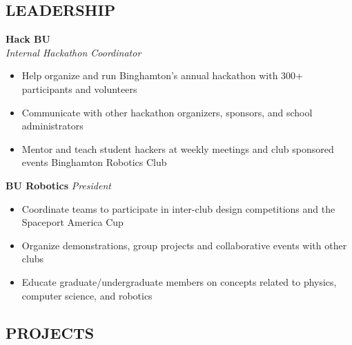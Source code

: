 \documentclass[11pt]{article}
\begin{document}
\subsection*{LEADERSHIP}
\vspace{1mm}
\spacedhrule{0.1em}{0.9em}
\textbf{Hack BU} \\
\textit{Internal Hackathon Coordinator}
\begin{itemize}
	\item Help organize and run Binghamton's annual hackathon with 300+ participants and volunteers
	\item Communicate with other hackathon organizers, sponsors, and school administrators
	\item Mentor and teach student hackers at weekly meetings and club sponsored events Binghamton Robotics Club
\end{itemize}
\textbf{BU Robotics}
\textit{President}
\begin{itemize}
	\item Coordinate teams to participate in inter-club design competitions and the Spaceport America Cup
	\item Organize demonstrations, group projects and collaborative events with other clubs
	\item Educate graduate/undergraduate members on concepts related to physics, computer science, and robotics
\end{itemize}
\vspace{4mm}

\subsection*{PROJECTS}
\vspace{1mm}
\spacedhrule{0.1em}{0.9em}
 
\end{document}
